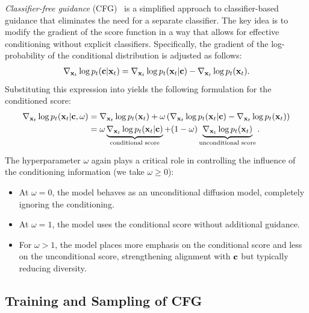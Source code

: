 \emph{Classifier-free guidance} (CFG)~\citep{ho2021classifier} is a simplified approach to classifier-based guidance that eliminates the need for a separate classifier. The key idea is to modify the gradient of the score function in a way that allows for effective conditioning without explicit classifiers. Specifically, the gradient of the log-probability of the conditional distribution is adjusted as follows:
\begin{align}
    \nabla_{{\mathbf{x}}_t} \log p_t({\mathbf{c}} | {\mathbf{x}}_t) = \nabla_{{\mathbf{x}}_t} \log p_t({\mathbf{x}}_t | {\mathbf{c}}) - \nabla_{{\mathbf{x}}_t} \log p_t({\mathbf{x}}_t).
\end{align}
Substituting this expression into  yields the following formulation for the conditioned score:
\begin{align}\label{eq:cfg-model}
\nabla_{{\mathbf{x}}_t} \log p_t({\mathbf{x}}_t | {\mathbf{c}}, \omega)
&= \nabla_{{\mathbf{x}}_t} \log p_t({\mathbf{x}}_t) + \omega \left( \nabla_{{\mathbf{x}}_t} \log p_t({\mathbf{x}}_t | {\mathbf{c}}) - \nabla_{{\mathbf{x}}_t} \log p_t({\mathbf{x}}_t) \right) \nonumber\\
&= \omega \underbrace{\nabla_{{\mathbf{x}}_t} \log p_t({\mathbf{x}}_t | {\mathbf{c}})}_{\text{conditional score}} + (1 - \omega) \underbrace{\nabla_{{\mathbf{x}}_t} \log p_t({\mathbf{x}}_t)}_{\text{unconditional score}}.
\end{align}

The hyperparameter $\omega$ again plays a critical role in controlling the influence of the conditioning information (we take $\omega \ge 0$):
\begin{itemize}
    \item At $\omega = 0$, the model behaves as an unconditional diffusion model, completely ignoring the conditioning.
    \item At $\omega = 1$, the model uses the conditional score without additional guidance.
    \item For $\omega > 1$, the model places more emphasis on the conditional score and less on the unconditional score, strengthening alignment with ${\mathbf{c}}$ but typically reducing diversity.
\end{itemize}

\subsection{Training and Sampling of CFG}


